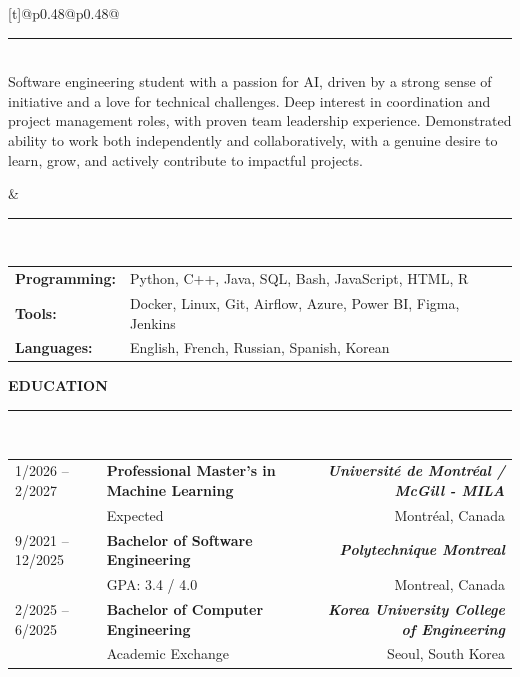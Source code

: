 \documentclass[a4paper,10pt]{article}
\begin{document}
\noindent
\begin{tabularx}{\textwidth}[t]{@{}p{0.48\textwidth}@{\hspace{2em}}p{0.48\textwidth}@{}}
  \parbox[t]{\linewidth}{
    \hspace{7em}\rule{\dimexpr\linewidth-6em}{0.9pt} \\[1em]
        Software engineering student with a passion for AI, driven by a strong sense of initiative and a love for technical challenges. Deep interest in coordination and project management roles, with proven team leadership experience. Demonstrated ability to work both independently and collaboratively, with a genuine desire to learn, grow, and actively contribute to impactful projects.
  }
  &
  \parbox[t]{\linewidth}{
    \hspace{6em}\rule{\dimexpr\linewidth-6.5em}{0.4pt} \\[1em]
    \begin{tabular}{@{}p{2.5cm}p{\dimexpr\linewidth-3.2cm}@{}}
      \textbf{Programming:} & Python, C++, Java, SQL, Bash, JavaScript, HTML, R \\[1.5em]
      \textbf{Tools:} & Docker, Linux, Git, Airflow, Azure, Power BI, Figma, Jenkins \\
      \textbf{Languages:} & English, French, Russian, Spanish, Korean
    \end{tabular}
  }
\end{tabularx}

\vspace{0.2em}
\textbf{\large EDUCATION} \hspace{1em}\rule{\dimexpr\linewidth-8em}{0.4pt} \\[0em]

\begin{tabularx}{\textwidth}{@{}p{3cm} X r@{}}
    1/2026 -- 2/2027 & 
    \textbf{Professional Master's in Machine Learning} 
    & \textbf{\textit{Université de Montréal / McGill  - MILA}} \\ 
    & Expected  & 
    Montréal, Canada \\[0.2em]
    
    9/2021 -- 12/2025 & \textbf{Bachelor of Software Engineering} & \textbf{\textit{Polytechnique Montreal}} \\
    & GPA: 3.4 / 4.0 & Montreal, Canada \\[0.2em]
    
    2/2025 -- 6/2025 & \textbf{Bachelor of Computer Engineering} & \textbf{\textit{Korea University College of Engineering}} \\
    & Academic Exchange & Seoul, South Korea &
\end{tabularx}
\end{document}
